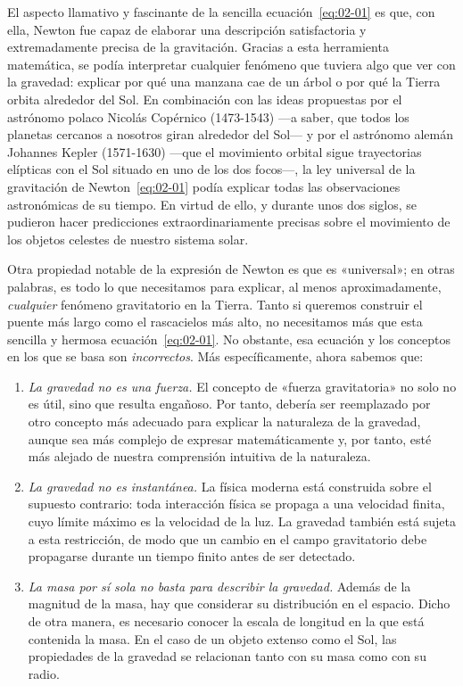 El aspecto llamativo y fascinante de la sencilla ecuación~\eqref{eq:02-01} es que,
con ella, Newton fue capaz de elaborar una descripción satisfactoria y extremadamente
precisa de la gravitación. Gracias a esta herramienta matemática, se podía
interpretar cualquier fenómeno que tuviera algo que ver con la gravedad: explicar
por qué una manzana cae de un árbol o por qué la Tierra orbita alrededor del Sol.
En combinación con las ideas propuestas por el astrónomo polaco Nicolás
Copérnico (1473-1543) ---a saber, que
todos los planetas cercanos a nosotros giran alrededor del Sol--- y por el astrónomo
alemán Johannes Kepler (1571-1630) ---que el movimiento
orbital sigue trayectorias elípticas con el Sol situado en
uno de los dos focos---, la ley universal de la gravitación de Newton~\eqref{eq:02-01}
podía explicar todas las observaciones astronómicas de su tiempo. En virtud de ello,
y durante unos dos siglos, se pudieron hacer predicciones extraordinariamente
precisas sobre el movimiento de los objetos celestes de nuestro sistema solar.

Otra propiedad notable de la expresión de Newton es que es «universal»; en otras
palabras, es todo lo que necesitamos para explicar, al menos aproximadamente,
\emph{cualquier} fenómeno gravitatorio en la Tierra. Tanto si queremos construir
el puente más largo como el rascacielos más alto, no necesitamos más que esta
sencilla y hermosa ecuación~\eqref{eq:02-01}. No obstante, esa ecuación y los
conceptos en los que se basa son \emph{incorrectos}. Más específicamente,
ahora sabemos que:

\begin{enumerate}
\item
\emph{La gravedad no es una fuerza.} El concepto de «fuerza gravitatoria» no solo
no es útil, sino que resulta engañoso. Por tanto, debería ser reemplazado por otro
concepto más adecuado para explicar la naturaleza de la gravedad, aunque sea más
complejo de expresar matemáticamente y, por tanto, esté más alejado de nuestra
comprensión intuitiva de la naturaleza.
\item
\emph{La gravedad no es instantánea.}
La física moderna está construida sobre el supuesto contrario: toda interacción
física se propaga a una velocidad finita, cuyo límite máximo es la velocidad de
la luz. La gravedad también está sujeta a esta restricción, de modo que un cambio
en el campo gravitatorio debe propagarse durante un tiempo finito antes de ser
detectado.
\item
\emph{La masa por sí sola no basta para describir la gravedad.} Además de la
magnitud de la masa, hay que considerar su distribución en el espacio. Dicho
de otra manera, es necesario conocer la escala de longitud en la que está
contenida la masa. En el caso de un objeto extenso como el Sol, las propiedades
de la gravedad se relacionan tanto con su masa como con su radio.
\end{enumerate}

